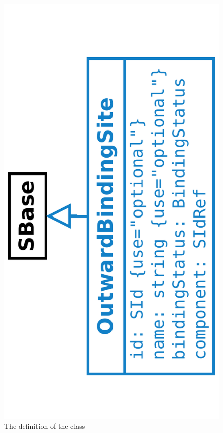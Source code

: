 \begin{figure}[htb]
  \begin{center}
    \includegraphics[angle=-90, scale=0.25]{./figs/multi_008_OutwardBindingSite.pdf}
    \caption{The definition of the \OutwardBindingSite class}
  \label{fig:OutwardBindingSite}
  \end{center}
\end{figure}

